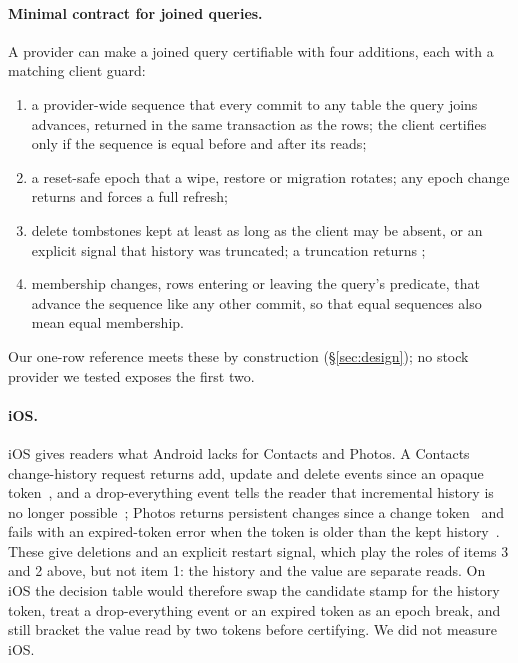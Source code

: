 \paragraph{Minimal contract for joined queries.} A provider can make a joined query certifiable with four additions, each with a matching client guard:
\begin{enumerate}[nosep,leftmargin=*]
\item a provider-wide sequence that every commit to any table the query joins advances, returned in the same transaction as the rows; the client certifies only if the sequence is equal before and after its reads;
\item a reset-safe epoch that a wipe, restore or migration rotates; any epoch change returns \Unknown and forces a full refresh;
\item delete tombstones kept at least as long as the client may be absent, or an explicit signal that history was truncated; a truncation returns \Unknown;
\item membership changes, rows entering or leaving the query's predicate, that advance the sequence like any other commit, so that equal sequences also mean equal membership.
\end{enumerate}
Our one-row reference meets these by construction (\S\ref{sec:design}); no stock provider we tested exposes the first two.

\paragraph{iOS.} iOS gives readers what Android lacks for Contacts and Photos. A Contacts change-history request returns add, update and delete events since an opaque token~\cite{apple_cnchangehistory}, and a drop-everything event tells the reader that incremental history is no longer possible~\cite{apple_cndropeverything}; Photos returns persistent changes since a change token~\cite{apple_phpersistent} and fails with an expired-token error when the token is older than the kept history~\cite{apple_phtokenexpired}. These give deletions and an explicit restart signal, which play the roles of items 3 and 2 above, but not item 1: the history and the value are separate reads. On iOS the decision table would therefore swap the candidate stamp for the history token, treat a drop-everything event or an expired token as an epoch break, and still bracket the value read by two tokens before certifying. We did not measure iOS.

